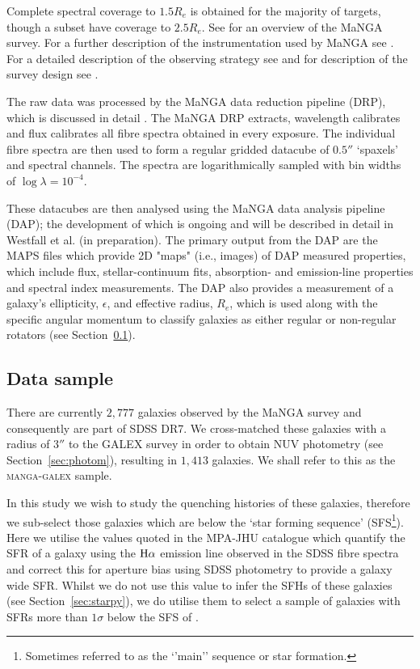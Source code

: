 \documentclass[useAMS,usenatbib]{mn2e}
\begin{document}
Complete spectral coverage to $1.5 R_e$ is obtained for the majority of targets, though a subset have coverage to $2.5 R_e$. See \cite{bundy15} for an overview of the MaNGA survey. For a further description of the instrumentation used by MaNGA see \cite{drory15}. For a detailed description of the observing strategy see \cite{law15} and for  description of the survey design see \cite{yan16}. %

The raw data was processed by the MaNGA data reduction pipeline (DRP), which is discussed in detail \cite{law16}. The MaNGA DRP extracts, wavelength calibrates and flux calibrates all fibre spectra obtained in every exposure. The individual fibre spectra are then used to form a regular gridded datacube of $0.5''$ ‘spaxels’ and spectral channels. The spectra are logarithmically sampled with bin widths of $\log{\lambda} = 10^{-4}$. 

These datacubes are then analysed using the MaNGA data analysis pipeline (DAP); the development of which is ongoing and will be described in detail in Westfall et al. (in preparation). The primary output from the DAP are the MAPS files which provide 2D "maps" (i.e., images) of DAP measured properties, which include flux, stellar-continuum fits, absorption- and emission-line properties and spectral index measurements. The DAP also provides a measurement of a galaxy's ellipticity, $\epsilon$, and effective radius, $R_e$, which is used along with the specific angular momentum to classify galaxies as either regular or non-regular rotators (see Section~\ref{sec:mangasample}). 

\subsection{Data sample}\label{sec:mangasample}

There are currently $2,777$ galaxies observed by the MaNGA survey and consequently are part of SDSS DR7. We cross-matched these galaxies with a radius of $3''$ to the GALEX survey in order to obtain NUV photometry (see Section~\ref{sec:photom}), resulting in $1,413$ galaxies. We shall refer to this as the \textsc{manga-galex} sample. 

In this study we wish to study the quenching histories of these galaxies, therefore we sub-select those galaxies which are below the `star forming sequence' (SFS\footnote{Sometimes referred to as the `'main'' sequence or star formation.}). Here we utilise the values quoted in the MPA-JHU catalogue \citep{kauffmann03, brinchmann04} which quantify the SFR of a galaxy using the $\rm{H}\alpha$ emission line observed in the SDSS fibre spectra and correct this for aperture bias using SDSS photometry to provide a galaxy wide SFR. Whilst we do not use this value to infer the SFHs of these galaxies (see Section~\ref{sec:starpy}), we do utilise them to select a sample of galaxies with SFRs more than $1\sigma$ below the SFS of \cite{peng10}. 
\end{document}
